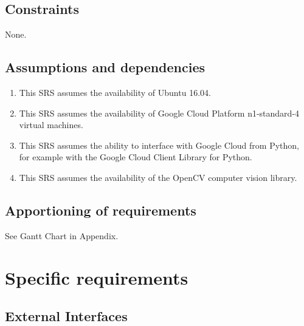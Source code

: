 \documentclass[10pt, onecolumn, draftclsnofoot, letterpaper, compsoc]{IEEEtran}
\begin{document}
\subsection{Constraints}
None.

\subsection{Assumptions and dependencies}
	\begin{enumerate}
		\item This SRS assumes the availability of Ubuntu 16.04.

		\item This SRS assumes the availability of Google Cloud Platform
		n1-standard-4 virtual machines.

		\item This SRS assumes the ability to interface with Google Cloud from
		Python, for example with the Google Cloud Client Library for Python.

		\item This SRS assumes the availability of the OpenCV computer
		vision library.
	\end{enumerate}

\subsection{Apportioning of requirements}
See Gantt Chart in Appendix.

\newpage
\section{Specific requirements}

\subsection{External Interfaces}
\end{document}

